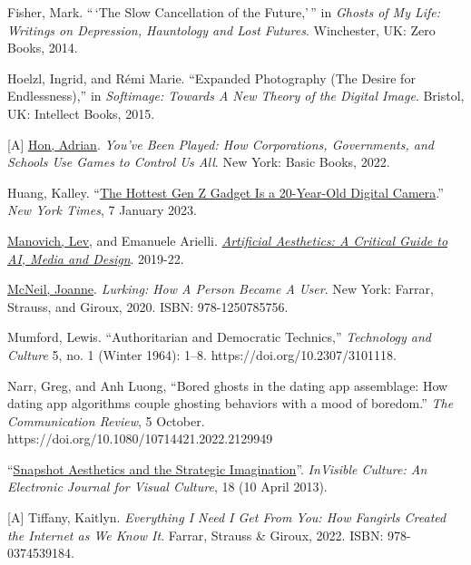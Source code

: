 \documentclass[
  letterpaper,
  DIV=11,
  numbers=noendperiod]{scrartcl}
\begin{document}
Fisher, Mark. ``\,`The Slow Cancellation of the Future,'\,'' in
\emph{Ghosts of My Life: Writings on Depression, Hauntology and Lost
Futures}. Winchester, UK: Zero Books, 2014.

Hoelzl, Ingrid, and Rémi Marie. ``Expanded Photography (The Desire for
Endlessness),'' in \emph{Softimage: Towards A New Theory of the Digital
Image}. Bristol, UK: Intellect Books, 2015.

{[}A{]} \href{https://mssv.net/}{Hon, Adrian}. \emph{You've Been Played:
How Corporations, Governments, and Schools Use Games to Control Us All}.
New York: Basic Books, 2022.

Huang, Kalley.
``\href{https://www.nytimes.com/2023/01/07/technology/digital-cameras-olympus-canon.html?fbclid=IwAR1X2DutHJgtJFKB6XdcFjbm3kFB9P-IXPT7HckeGErsOrk0jTVGxugXYzk\&referringSource=articleShare\&smid=nytcore-ios-share\&unlocked_article_code=AAAAAAAAAAAAAAAACEIPuonUktbfqIhkSVUbBCbJUNMnqBqCgvfeh7A9iX7iJSzQQj9Hwv4cGM2H_1bIfbd4ItA62TOdAt9dNbtlDNpD8thiBW0_AQ-5vsnD350fPyQ-rY_0Dm9qhMvBUL59-jTjPizkd7wmgezgtErDOzbvUaLc2CB2LF1isoIlIQ_xoQEAxqjPGuB009hsj7x2Vt0hG2B2NGTdtOLoCh5_JNyFchjZjwE8UOhdUjzQ9sWOv_NCKE4BTAKbEw4spDo0-9heO9kIPa7gLBZGeMv2gLoZD2cAP55OPFabG3prPPkN94E3_vHG}{The
Hottest Gen Z Gadget Is a 20-Year-Old Digital Camera}.'' \emph{New York
Times}, 7 January 2023.

\href{https://manovich.net/}{Manovich, Lev}, and Emanuele Arielli.
\href{http://manovich.net/index.php/projects/artificial-aesthetics-book}{\emph{Artificial
Aesthetics: A Critical Guide to AI, Media and Design}}. 2019-22.

\href{https://joannemcneil.com/}{McNeil, Joanne}. \emph{Lurking: How A
Person Became A User}. New York: Farrar, Strauss, and Giroux, 2020.
ISBN: 978-1250785756.

Mumford, Lewis. ``Authoritarian and Democratic Technics,''
\emph{Technology and Culture} 5, no. 1 (Winter 1964): 1--8.
https://doi.org/10.2307/3101118.

Narr, Greg, and Anh Luong, ``Bored ghosts in the dating app assemblage:
How dating app algorithms couple ghosting behaviors with a mood of
boredom.'' \emph{The Communication Review}, 5 October.
https://doi.org/10.1080/10714421.2022.2129949

``\href{http://ivc.lib.rochester.edu/snapshot-aesthetics-and-the-strategic-imagination/}{Snapshot
Aesthetics and the Strategic Imagination}''. \emph{InVisible Culture: An
Electronic Journal for Visual Culture}, 18 (10 April 2013).

{[}A{]} Tiffany, Kaitlyn. \emph{Everything I Need I Get From You: How
Fangirls Created the Internet as We Know It}. Farrar, Strauss \& Giroux,
2022. ISBN: 978-0374539184.
\end{document}
